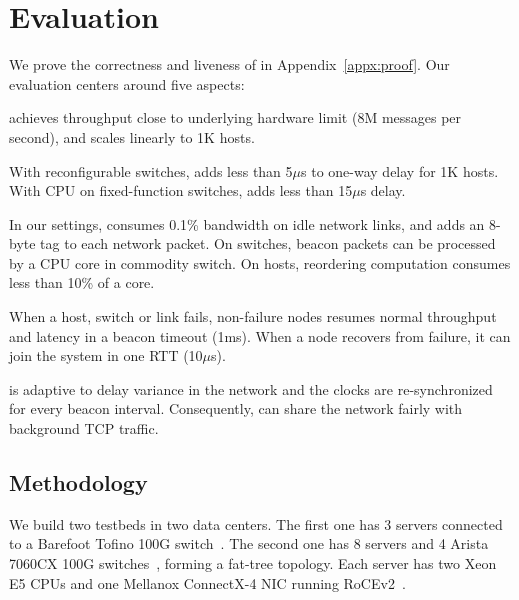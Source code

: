 \section{Evaluation}
\label{sec:evaluation}

We prove the correctness and liveness of \sys in Appendix~\ref{appx:proof}.
Our evaluation centers around five aspects:

\sys achieves throughput close to underlying hardware limit (8M messages per second), and scales linearly to 1K hosts.

With reconfigurable switches, \sys adds less than 5$\mu$s to one-way delay for 1K hosts. With CPU on fixed-function switches, \sys adds less than 15$\mu$s delay.

In our settings, \sys consumes 0.1\% bandwidth on idle network links, and adds an 8-byte tag to each network packet. On switches, beacon packets can be processed by a CPU core in commodity switch. On hosts, reordering computation consumes less than 10\% of a core.

When a host, switch or link fails, non-failure nodes resumes normal throughput and latency in a beacon timeout (1ms).
When a node recovers from failure, it can join the system in one RTT (10$\mu$s).

\sys is adaptive to delay variance in the network and the clocks are re-synchronized for every beacon interval. Consequently, \sys can share the network fairly with background TCP traffic.

\subsection{Methodology}
\label{sec:testbed}

We build two testbeds in two data centers.
The first one has 3 servers connected to a Barefoot Tofino 100G switch~\cite{tofino}.
The second one has 8 servers and 4 Arista 7060CX 100G switches~\cite{arista}, forming a fat-tree topology.
Each server has two Xeon E5 CPUs and one Mellanox ConnectX-4 NIC running RoCEv2~\cite{infinibandrocev2}.


